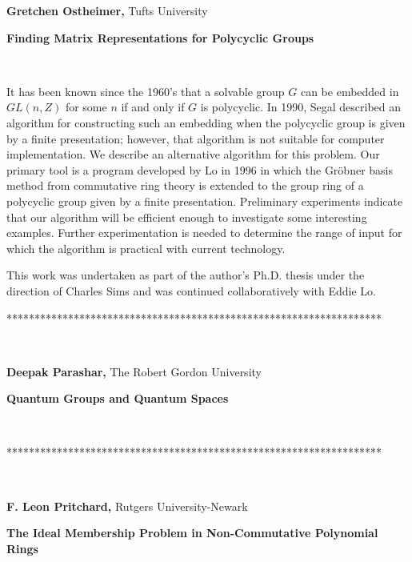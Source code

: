 \documentclass[12pt]{article}
\begin{document}
\vspace{.1in}

\noindent \textbf{Gretchen Ostheimer, }Tufts University

\noindent \textbf{Finding Matrix Representations for Polycyclic Groups}

\smallskip\ 

\noindent It has been known since the 1960's that a solvable group $G$ can
be embedded in $GL\left( n,Z\right) $ for some $n$ if and only if $G$ is
polycyclic. In 1990, Segal described an algorithm for constructing such an
embedding when the polycyclic group is given by a finite presentation;
however, that algorithm is not suitable for computer implementation. We
describe an alternative algorithm for this problem. Our primary tool is a
program developed by Lo in 1996 in which the Gr\"{o}bner basis method from
commutative ring theory is extended to the group ring of a polycyclic group
given by a finite presentation. Preliminary experiments indicate that our
algorithm will be efficient enough to investigate some interesting examples.
Further experimentation is needed to determine the range of input for which
the algorithm is practical with current technology.

This work was undertaken as part of the author's Ph.D. thesis under the
direction of Charles Sims and was continued collaboratively with Eddie Lo.

\begin{center}
*******************************************************************
\end{center}

\smallskip\ 

\noindent \textbf{Deepak Parashar,} The Robert Gordon University

\noindent \textbf{Quantum Groups and Quantum Spaces }

\smallskip\ 

\noindent  

\begin{center}
*******************************************************************
\end{center}

\smallskip\ 

\noindent \textbf{F. Leon Pritchard, }Rutgers University-Newark

\noindent \textbf{The Ideal Membership Problem in Non-Commutative Polynomial
Rings}

\smallskip\ 
\end{document}
